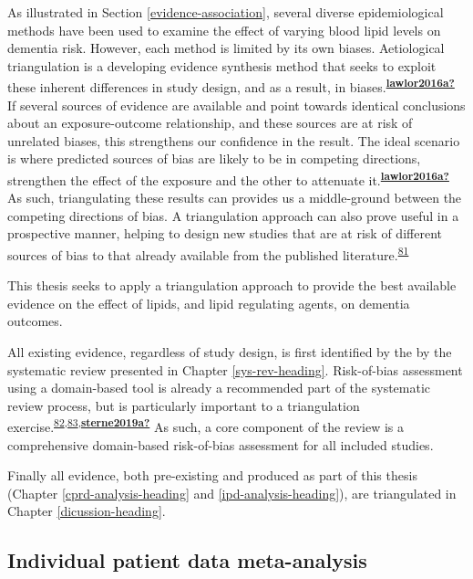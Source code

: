 \documentclass[a4paper, twoside]{templates/ociamthesis}
\begin{document}
As illustrated in Section \ref{evidence-association}, several diverse epidemiological methods have been used to examine the effect of varying blood lipid levels on dementia risk. However, each method is limited by its own biases. Aetiological triangulation is a developing evidence synthesis method that seeks to exploit these inherent differences in study design, and as a result, in biases.\textsuperscript{\protect\hyperlink{ref-lawlor2016a}{\textbf{lawlor2016a?}}} If several sources of evidence are available and point towards identical conclusions about an exposure-outcome relationship, and these sources are at risk of unrelated biases, this strengthens our confidence in the result. The ideal scenario is where predicted sources of bias are likely to be in competing directions, strengthen the effect of the exposure and the other to attenuate it.\textsuperscript{\protect\hyperlink{ref-lawlor2016a}{\textbf{lawlor2016a?}}} As such, triangulating these results can provides us a middle-ground between the competing directions of bias. A triangulation approach can also prove useful in a prospective manner, helping to design new studies that are at risk of different sources of bias to that already available from the published literature.\textsuperscript{\protect\hyperlink{ref-munafo2018}{81}}

This thesis seeks to apply a triangulation approach to provide the best available evidence on the effect of lipids, and lipid regulating agents, on dementia outcomes.

All existing evidence, regardless of study design, is first identified by the by the systematic review presented in Chapter \ref{sys-rev-heading}. Risk-of-bias assessment using a domain-based tool is already a recommended part of the systematic review process, but is particularly important to a triangulation exercise.\textsuperscript{\protect\hyperlink{ref-page2021}{82},\protect\hyperlink{ref-mcguinness2018}{83},\protect\hyperlink{ref-sterne2019a}{\textbf{sterne2019a?}}} As such, a core component of the review is a comprehensive domain-based risk-of-bias assessment for all included studies.

Finally all evidence, both pre-existing and produced as part of this thesis (Chapter \ref{cprd-analysis-heading} and \ref{ipd-analysis-heading}), are triangulated in Chapter \ref{dicussion-heading}.

\hypertarget{individual-patient-data-meta-analysis}{%
\subsection{Individual patient data meta-analysis}\label{individual-patient-data-meta-analysis}}
\end{document}
